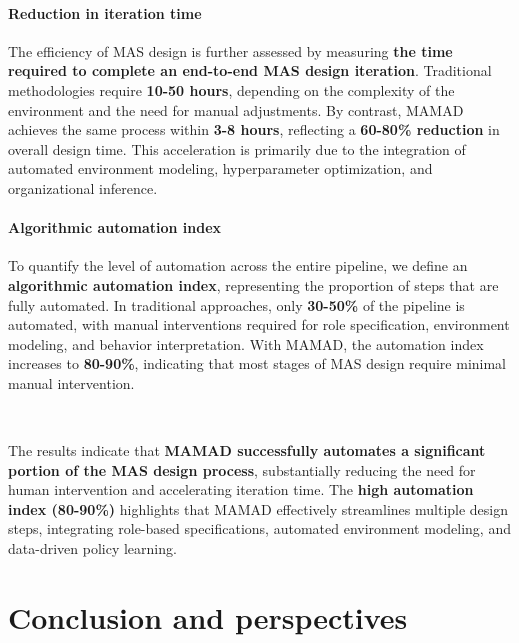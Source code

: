 \documentclass[journal]{IEEEtai}
\begin{document}
\paragraph{Reduction in iteration time}
The efficiency of MAS design is further assessed by measuring \textbf{the time required to complete an end-to-end MAS design iteration}. Traditional methodologies require \textbf{10-50 hours}, depending on the complexity of the environment and the need for manual adjustments. By contrast, MAMAD achieves the same process within \textbf{3-8 hours}, reflecting a \textbf{60-80\% reduction} in overall design time. This acceleration is primarily due to the integration of automated environment modeling, hyperparameter optimization, and organizational inference.

\paragraph{Algorithmic automation index}
To quantify the level of automation across the entire pipeline, we define an \textbf{algorithmic automation index}, representing the proportion of steps that are fully automated. In traditional approaches, only \textbf{30-50\%} of the pipeline is automated, with manual interventions required for role specification, environment modeling, and behavior interpretation. With MAMAD, the automation index increases to \textbf{80-90\%}, indicating that most stages of MAS design require minimal manual intervention.

\

The results indicate that \textbf{MAMAD successfully automates a significant portion of the MAS design process}, substantially reducing the need for human intervention and accelerating iteration time. The \textbf{high automation index (80-90\%)} highlights that MAMAD effectively streamlines multiple design steps, integrating role-based specifications, automated environment modeling, and data-driven policy learning.

\clearpage

\section{Conclusion and perspectives}\label{sec:conclusion}
\end{document}
